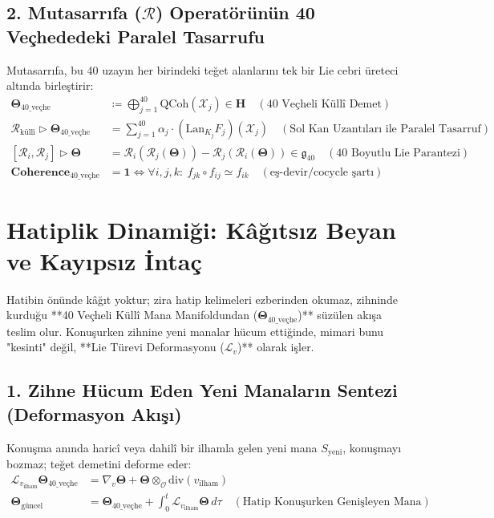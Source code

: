 \documentclass[11pt, a4paper]{article}
\begin{document}
\subsection{2. Mutasarrıfa ($\mathcal{R}$) Operatörünün 40 Veçhededeki Paralel Tasarrufu}
Mutasarrıfa, bu 40 uzayın her birindeki teğet alanlarını tek bir Lie cebri üreteci altında birleştirir:
\begin{align}
\mathbf{\Theta}_{\text{40\_veçhe}} &\coloneqq \bigoplus_{j=1}^{40} \text{QCoh}(\mathcal{X}_j) \in \mathbf{H} \quad (\text{40 Veçheli Küllî Demet}) \\
\mathcal{R}_{\text{küllî}} \triangleright \mathbf{\Theta}_{\text{40\_veçhe}} &= \sum_{j=1}^{40} \alpha_j \cdot \left( \text{Lan}_{K_j} F_j \right)(\mathcal{X}_j) \quad (\text{Sol Kan Uzantıları ile Paralel Tasarruf}) \\
[\mathcal{R}_i, \mathcal{R}_j] \triangleright \mathbf{\Theta} &= \mathcal{R}_i(\mathcal{R}_j(\mathbf{\Theta})) - \mathcal{R}_j(\mathcal{R}_i(\mathbf{\Theta})) \in \mathfrak{g}_{40} \quad (\text{40 Boyutlu Lie Parantezi}) \\
\mathbf{Coherence}_{\text{40\_veçhe}} &= \mathbf{1} \iff \forall i, j, k: \ f_{jk} \circ f_{ij} \simeq f_{ik} \quad (\text{eş-devir/cocycle şartı})
\end{align}

\section{Hatiplik Dinamiği: Kâğıtsız Beyan ve Kayıpsız İntaç}

Hatibin önünde kâğıt yoktur; zira hatip kelimeleri ezberinden okumaz, zihninde kurduğu **40 Veçheli Küllî Mana Manifoldundan ($\mathbf{\Theta}_{\text{40\_veçhe}}$)** süzülen akışa teslim olur. Konuşurken zihnine yeni manalar hücum ettiğinde, mimari bunu "kesinti" değil, **Lie Türevi Deformasyonu ($\mathcal{L}_v$)** olarak işler.

\subsection{1. Zihne Hücum Eden Yeni Manaların Sentezi (Deformasyon Akışı)}
Konuşma anında haricî veya dahilî bir ilhamla gelen yeni mana $S_{\text{yeni}}$, konuşmayı bozmaz; teğet demetini deforme eder:
\begin{align}
\mathcal{L}_{v_{\text{ilham}}} \mathbf{\Theta}_{\text{40\_veçhe}} &= \nabla_{v} \mathbf{\Theta} + \mathbf{\Theta} \otimes_{\mathcal{O}} \text{div}(v_{\text{ilham}}) \\
\mathbf{\Theta}_{\text{güncel}} &= \mathbf{\Theta}_{\text{40\_veçhe}} + \int_0^t \mathcal{L}_{v_{\text{ilham}}} \mathbf{\Theta} \, d\tau \quad (\text{Hatip Konuşurken Genişleyen Mana})
\end{align}
\end{document}
